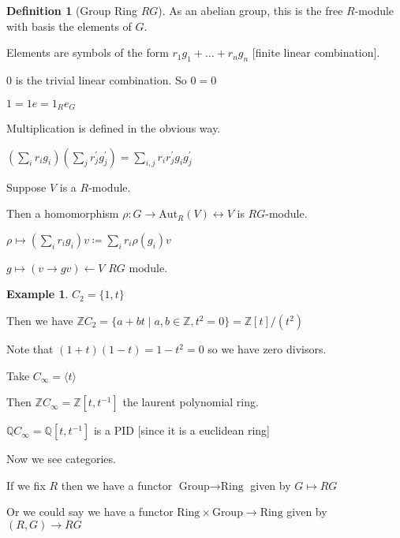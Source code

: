 \documentclass{article}
\theoremstyle{definition}
\newtheorem*{example}{Example}
\newtheorem*{definition}{Definition}
\begin{document}
\begin{definition}
    [Group Ring \(RG\)]

    As an abelian group, this is the free \(R\)-module with basis the elements of \(G\).

    Elements are symbols of the form \(r_1 g_1 + \dots + r_n g_n\) [finite linear combination].

    \(0\) is the trivial linear combination. So \(0 = 0\)

    \(1 = 1e = 1_R e_G\)
    
    Multiplication is defined in the obvious way.

    \((\sum_{i} r_i g_i)(\sum_{j} r_j^{\prime} g_j^{\prime} ) = \sum_{i, j} r_i r_j^{\prime} g_i g_j^{\prime} \) 

\end{definition}

Suppose \(V\) is a \(R\)-module.

Then a homomorphism \(\rho : G \to \text{Aut}_R(V) \leftrightarrow V\) is \(RG\)-module.

\(\rho \mapsto (\sum_{i} r_i g_i)v \coloneqq \sum_{i} r_i \rho(g_i)v\)

\(g \mapsto (v \to gv) \leftarrow V\) \(RG\) module.

\begin{example}
    \(C_2 = \{ 1,t \}\) 

    Then we have \(\mathbb{Z} C_2 = \{ a + bt \mid a, b\in\mathbb{Z}, t^2 = 0\} = \mathbb{Z} [t] / (t^2) \) 

    Note that \((1+t)(1-t) = 1-t^2 = 0\) so we have zero divisors.

    Take \(C_\infty = \langle t \rangle \) 

    Then \(\mathbb{Z} C_\infty =\mathbb{Z} [t, t^{-1}]\) the laurent polynomial ring.

    \(\mathbb{Q} C_\infty = \mathbb{Q}[t, t^{-1}]\) is a PID [since it is a euclidean ring]

\end{example}

Now we see categories.

If we fix \(R\) then we have a functor \(\text{Group} \to \text{Ring}\) given by \(G \mapsto RG\)

Or we could say we have a functor \(\text{Ring} \times \text{Group} \to \text{Ring}\) given by \((R, G) \to RG\) 
\end{document}
